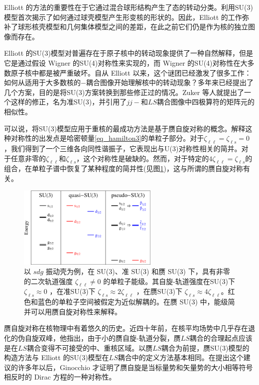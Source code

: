 Elliott 的方法的重要性在于它通过混合球形结构产生了态的转动分类。利用SU(3)模型首次揭示了如何通过球壳模型产生形变核的形状的。因此，Elliott 的工作弥补了球形核壳模型和几何集体模型之间的差距，在此之前它们仍是作为核的独立图像而存在。

Elliott 的SU(3)模型对普遍存在于原子核中的转动现象提供了一种自然解释，但是它是通过假设 Wigner 的SU(4)对称性来实现的，而 Wigner 的SU(4)对称性在大多数原子核中都是被严重破坏。自从 Elliott 以来，这个谜团已经激发了很多工作：如何从适用于大多数核的$-$耦合图像开始理解核中的转动现象？多年来已经提出了几个方案，目的是将SU(3)方案转换到那些修正过的情况。Zuker 等人就提出了一个这样的修正，名为准SU(3)，并引用了$jj-$和$LS$耦合图像中四极算符的矩阵元的相似性。

可以说，将SU(3)模型应用于重核的最成功方法是基于赝自旋对称的概念。解释这种对称性的出发点是哈密顿量\ref{eq_hamilton3}的单粒子部分。对于$\zeta_{\ell\ell}=\zeta_{\ell s}=0$，我们得到了一个三维各向同性谐振子，它表现出与U(3)对称性相关的简并。对于任意非零的$\zeta_{\ell\ell}$和$\zeta_{\ell s}$，这个对称性是破缺的。然而，对于特定的$4\zeta_{\ell\ell}=\zeta_{\ell s}$的组合，在单粒子谱中恢复了某种程度的简并性(见图\ref{F_qpsu3})，这与所谓的赝自旋对称有关。
\begin{figure}[H]
\centering
\includegraphics[width=0.6\textwidth]{figure/F_qpsu3.png}
\caption{以 $sdg$ 振动壳为例，在 SU(3)、准 SU(3) 和赝 SU(3) 下，具有非零的二次轨道强度 $\zeta_{\ell\ell}\ne0$ 的单粒子能级。其自旋-轨道强度在SU(3)下 $\zeta_{\ell s}\approx0$ ，在准SU(3)下 $\zeta_{\ell s}\approx2\zeta_{\ell\ell}$ ，在赝SU(3)下 $\zeta_{\ell s}\approx4\zeta_{\ell\ell}$。红色和蓝色的单粒子空间被假定为近似解耦的。在赝 SU(3) 中，能级简并可以用赝自旋对称性来解释。\label{F_qpsu3}}
\end{figure}

赝自旋对称在核物理中有着悠久的历史。近四十年前，在核平均场势中几乎存在退化的伪自旋双峰，他指出，由于小的赝自旋-轨道分裂，赝$LS$耦合的合理起点应该是在$LS$耦合变得不可接受的中、重核区域。以赝$LS$耦合为前提，赝SU(3)模型的构造方法与 Elliott 的SU(3)模型在$LS$耦合中的定义方法基本相同。在提出这个建议的许多年以后，Ginocchio 才证明了赝自旋是当标量势和矢量势的大小相等符号相反时的 Dirac 方程的一种对称性。

